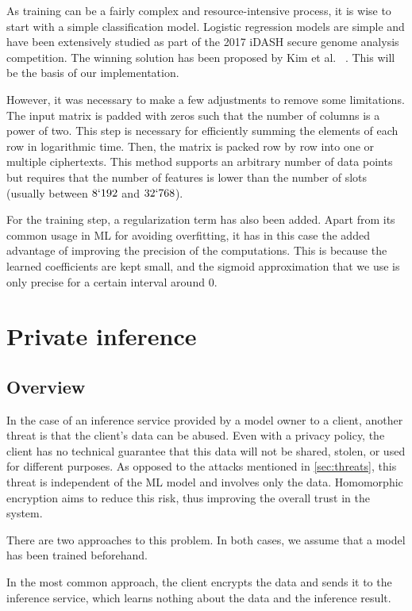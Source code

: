 \documentclass[a4paper,11pt,oneside]{report}
\begin{document}
As training can be a fairly complex and resource-intensive process, it is wise to start with a simple classification model. 
Logistic regression models are simple and have been extensively studied as part of the 2017 iDASH secure genome analysis competition. 
The winning solution has been proposed by Kim et al. ~\cite{kim_logistic_2018}. 
This will be the basis of our implementation.

However, it was necessary to make a few adjustments to remove some limitations. 
The input matrix is padded with zeros such that the number of columns is a power of two. 
This step is necessary for efficiently summing the elements of each row in logarithmic time. 
Then, the matrix is packed row by row into one or multiple ciphertexts. 
This method supports an arbitrary number of data points but requires that the number of features is lower than the number of slots (usually between $8`192$ and $32`768$). 

For the training step, a regularization term has also been added. 
Apart from its common usage in ML for avoiding overfitting, it has in this case the added advantage of improving the precision of the computations. 
This is because the learned coefficients are kept small, and the sigmoid approximation that we use is only precise for a certain interval around $0$.


\section{Private inference}\label{sec:private_inference}

\subsection{Overview}

In the case of an inference service provided by a model owner to a client, another threat is that the client's data can be abused. 
Even with a privacy policy, the client has no technical guarantee that this data will not be shared, stolen, or used for different purposes. 
As opposed to the attacks mentioned in \autoref{sec:threats}, this threat is independent of the ML model and involves only the data. 
Homomorphic encryption aims to reduce this risk, thus improving the overall trust in the system.

There are two approaches to this problem. 
In both cases, we assume that a model has been trained beforehand. 

In the most common approach, the client encrypts the data and sends it to the inference service, which learns nothing about the data and the inference result.
\end{document}
